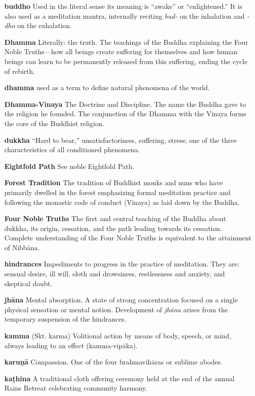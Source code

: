\textbf{buddho} Used in the literal sense its meaning is ``awake'' or 
``enlightened.'' It is also used as a meditation mantra, internally 
reciting \emph{bud-} on the inhalation and \emph{-dho} on the 
exhalation.

\textbf{Dhamma} Literally: the truth. The teachings of the Buddha 
explaining the Four Noble Truths---how all beings create suffering for 
themselves and how human beings can learn to be permanently released 
from this suffering, ending the cycle of rebirth.

\textbf{dhamma} used as a term to define natural phenomena of the world.

\textbf{Dhamma-Vinaya} The Doctrine and Discipline. The name the Buddha 
gave to the religion he founded. The conjunction of the Dhamma with the 
Vinaya forms the core of the Buddhist religion.

\textbf{dukkha} ``Hard to bear,'' unsatisfactoriness, suffering, 
stress; one of the three characteristics of all conditioned phenomena.

\textbf{Eightfold Path} See noble Eightfold Path.

\textbf{Forest Tradition} The tradition of Buddhist monks and nuns who 
have primarily dwelled in the forest emphasizing formal meditation 
practice and following the monastic code of conduct (Vinaya) as laid 
down by the Buddha.

\textbf{Four Noble Truths} The first and central teaching of the Buddha 
about dukkha, its origin, cessation, and the path leading towards its 
cessation. Complete understanding of the Four Noble Truths is 
equivalent to the attainment of Nibbāna.

\textbf{hindrances} Impediments to progress in the practice of 
meditation. They are: sensual desire, ill will, sloth and drowsiness, 
restlessness and anxiety, and skeptical doubt.

\textbf{jhāna} Mental absorption. A state of strong concentration 
focused on a single physical sensation or mental notion. Development of 
\emph{jhāna} arises from the temporary suspension of the hindrances.

\textbf{kamma} (Skt. karma) Volitional action by means of body, speech, 
or mind, always leading to an effect (kamma-vipāka).

\textbf{karuṇā} Compassion. One of the four brahmavihāras or 
sublime abodes.

\textbf{kaṭhina} A traditional cloth offering ceremony held at the 
end of the annual Rains Retreat celebrating community harmony.

